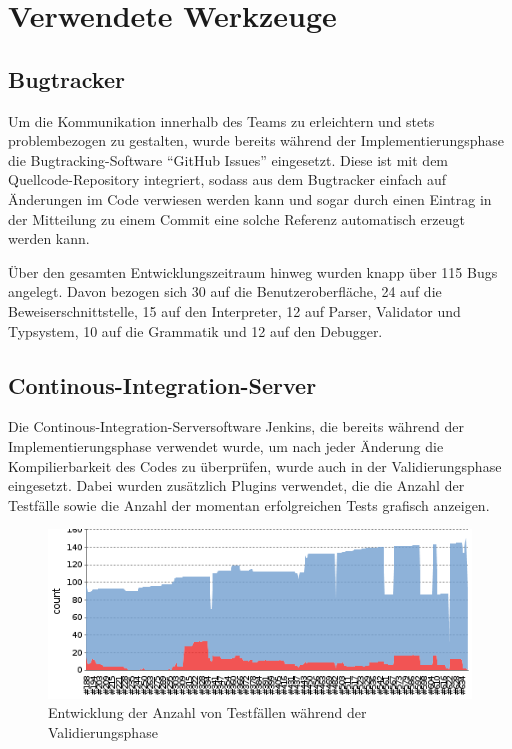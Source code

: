 \section{Verwendete Werkzeuge}
\subsection{Bugtracker}
Um die Kommunikation innerhalb des Teams zu erleichtern und stets problembezogen zu gestalten, wurde bereits während der Implementierungsphase  die Bugtracking-Software "`GitHub Issues"' eingesetzt. Diese ist mit dem Quellcode-Repository integriert, sodass aus dem Bugtracker einfach auf Änderungen im Code verwiesen werden kann und sogar durch einen Eintrag in der Mitteilung zu einem Commit eine solche Referenz automatisch erzeugt werden kann.

Über den gesamten Entwicklungszeitraum hinweg wurden knapp über 115 Bugs angelegt. Davon bezogen sich 30 auf die Benutzeroberfläche, 24 auf die Beweiserschnittstelle, 15 auf den Interpreter, 12 auf Parser, Validator und Typsystem, 10 auf die Grammatik und 12 auf den Debugger.

\subsection{Continous-Integration-Server}
Die Continous-Integration-Serversoftware Jenkins, die bereits während der Implementierungsphase verwendet wurde, um nach jeder Änderung die Kompilierbarkeit des Codes zu überprüfen, wurde auch in der Validierungsphase eingesetzt. Dabei wurden zusätzlich Plugins verwendet, die die Anzahl der Testfälle sowie die Anzahl der momentan erfolgreichen Tests grafisch anzeigen.

\begin{center}
	\begin{figure}[h] %
		\includegraphics[width=13cm]{images/jenkins-test-trend.png}
		\caption{Entwicklung der Anzahl von Testfällen während der Validierungsphase}
	\end{figure}
\end{center}
